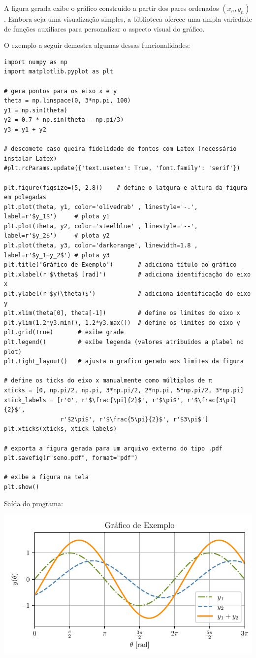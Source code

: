 A figura gerada exibe o gráfico construído a partir dos pares ordenados $(x_n, y_n)$.
Embora seja uma visualização simples, a biblioteca  oferece uma ampla variedade
de funções auxiliares para personalizar o aspecto visual do gráfico.

O exemplo a seguir demostra algumas dessas funcionalidades:
\begin{verbatim}
import numpy as np
import matplotlib.pyplot as plt

# gera pontos para os eixo x e y
theta = np.linspace(0, 3*np.pi, 100)
y1 = np.sin(theta)
y2 = 0.7 * np.sin(theta - np.pi/3)
y3 = y1 + y2

# descomete caso queira fidelidade de fontes com Latex (necessário instalar Latex)
#plt.rcParams.update({'text.usetex': True, 'font.family': 'serif'})

plt.figure(figsize=(5, 2.8))    # define o latgura e altura da figura em polegadas
plt.plot(theta, y1, color='olivedrab' , linestyle='-.', label=r'$y_1$')     # plota y1
plt.plot(theta, y2, color='steelblue' , linestyle='--', label=r'$y_2$')     # plota y2
plt.plot(theta, y3, color='darkorange', linewidth=1.8 , label=r'$y_1+y_2$') # plota y3
plt.title('Gráfico de Exemplo')       # adiciona título ao gráfico
plt.xlabel(r'$\theta$ [rad]')         # adiciona identificação do eixo x
plt.ylabel(r'$y(\theta)$')            # adiciona identificação do eixo y
plt.xlim(theta[0], theta[-1])         # define os limites do eixo x
plt.ylim(1.2*y3.min(), 1.2*y3.max())  # define os limites do eixo y
plt.grid(True)       # exibe grade
plt.legend()         # exibe legenda (valores atribuidos a plabel no plot)
plt.tight_layout()   # ajusta o grafico gerado aos limites da figura

# define os ticks do eixo x manualmente como múltiplos de π
xticks = [0, np.pi/2, np.pi, 3*np.pi/2, 2*np.pi, 5*np.pi/2, 3*np.pi]
xtick_labels = [r'0', r'$\frac{\pi}{2}$', r'$\pi$', r'$\frac{3\pi}{2}$',
                r'$2\pi$', r'$\frac{5\pi}{2}$', r'$3\pi$']
plt.xticks(xticks, xtick_labels)

# exporta a figura gerada para um arquivo externo do tipo .pdf
plt.savefig(r"seno.pdf", format="pdf")

# exibe a figura na tela
plt.show()
\end{verbatim}

Saída do programa:
\begin{center}
    \includegraphics[scale=1.0]{figs/seno}
\end{center}

